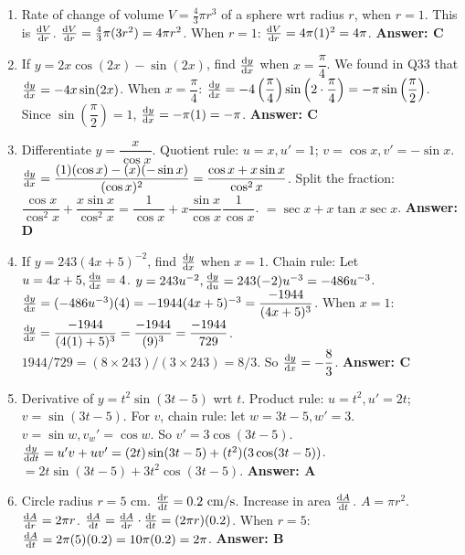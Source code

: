 \begin{enumerate}[label={\arabic*.}]
  \item Rate of change of volume \(V=\frac{4}{3}\pi r^3\) of a sphere wrt radius \(r\), when \(r=1\). This is \(\frac{\mathrm{d}V}{\mathrm{d}r}\).
    \(\frac{\mathrm{d}V}{\mathrm{d}r} = \frac{4}{3}\pi (3r^2) = 4\pi r^2\).
    When \(r=1\): \(\frac{\mathrm{d}V}{\mathrm{d}r} = 4\pi (1)^2 = 4\pi\).
    \textbf{Answer: C}

  \item If \(y = 2x\cos(2x) - \sin(2x)\), find \(\frac{\mathrm{d}y}{\mathrm{d}x}\) when \(x = \dfrac{\pi}{4}\).
    We found in Q33 that \(\frac{\mathrm{d}y}{\mathrm{d}x} = -4x\sin(2x)\).
    When \(x = \dfrac{\pi}{4}\): \(\frac{\mathrm{d}y}{\mathrm{d}x} = -4\left(\dfrac{\pi}{4}\right)\sin\left(2 \cdot \dfrac{\pi}{4}\right) = -\pi \sin\left(\dfrac{\pi}{2}\right)\).
    Since \(\sin\left(\dfrac{\pi}{2}\right) = 1\), \(\frac{\mathrm{d}y}{\mathrm{d}x} = -\pi(1) = -\pi\).
    \textbf{Answer: C}

  \item Differentiate \(y = \dfrac{x}{\cos x}\).
    Quotient rule: \(u=x, u'=1\); \(v=\cos x, v'=-\sin x\).
    \(\frac{\mathrm{d}y}{\mathrm{d}x} = \dfrac{(1)(\cos x) - (x)(-\sin x)}{(\cos x)^2} = \dfrac{\cos x + x\sin x}{\cos^2 x}\).
    Split the fraction: \(\dfrac{\cos x}{\cos^2 x} + \dfrac{x\sin x}{\cos^2 x} = \dfrac{1}{\cos x} + x \dfrac{\sin x}{\cos x} \dfrac{1}{\cos x}\).
    \(= \sec x + x \tan x \sec x\).
    \textbf{Answer: D}

  \item If \(y = 243(4x+5)^{-2}\), find \(\frac{\mathrm{d}y}{\mathrm{d}x}\) when \(x=1\).
    Chain rule: Let \(u=4x+5, \frac{\mathrm{d}u}{\mathrm{d}x}=4\). \(y=243u^{-2}, \frac{\mathrm{d}y}{\mathrm{d}u}=243(-2)u^{-3} = -486u^{-3}\).
    \(\frac{\mathrm{d}y}{\mathrm{d}x} = (-486u^{-3})(4) = -1944(4x+5)^{-3} = \dfrac{-1944}{(4x+5)^3}\).
    When \(x=1\): \(\frac{\mathrm{d}y}{\mathrm{d}x} = \dfrac{-1944}{(4(1)+5)^3} = \dfrac{-1944}{(9)^3} = \dfrac{-1944}{729}\).
    \(1944 / 729 = (8 \times 243) / (3 \times 243) = 8/3\).
    So \(\frac{\mathrm{d}y}{\mathrm{d}x} = -\dfrac{8}{3}\).
    \textbf{Answer: C}

  \item Derivative of \(y = t^2 \sin(3t-5)\) wrt \(t\).
    Product rule: \(u=t^2, u'=2t\); \(v=\sin(3t-5)\).
    For \(v\), chain rule: let \(w=3t-5, w'=3\). \(v=\sin w, v_w'=\cos w\). So \(v'=3\cos(3t-5)\).
    \(\frac{\mathrm{d}y}{\mathrm{d}dt} = u'v + uv' = (2t)\sin(3t-5) + (t^2)(3\cos(3t-5))\).
    \(= 2t\sin(3t-5) + 3t^2\cos(3t-5)\).
    \textbf{Answer: A}

  \item Circle radius \(r=5\) cm. \(\frac{\mathrm{d}r}{\mathrm{d}t} = 0.2 \text{ cm/s}\). Increase in area \(\frac{\mathrm{d}A}{\mathrm{d}t}\).
    \(A = \pi r^2\). \(\frac{\mathrm{d}A}{\mathrm{d}r} = 2\pi r\).
    \(\frac{\mathrm{d}A}{\mathrm{d}t} = \frac{\mathrm{d}A}{\mathrm{d}r} \cdot \frac{\mathrm{d}r}{\mathrm{d}t} = (2\pi r)(0.2)\).
    When \(r=5\): \(\frac{\mathrm{d}A}{\mathrm{d}t} = 2\pi(5)(0.2) = 10\pi(0.2) = 2\pi\).
    \textbf{Answer: B}


\end{enumerate}
